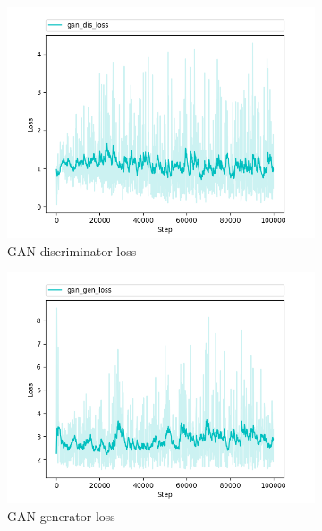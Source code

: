 \begin{figure}[h]
  \begin{subfigure}[b]{0.5\textwidth}
    \includegraphics[width=\textwidth]{figures/gan_dis_loss}
    \caption{GAN discriminator loss}
    \label{fig:gan_dis_loss}
  \end{subfigure}
  \hfill
  \begin{subfigure}[b]{0.5\textwidth}
    \includegraphics[width=\textwidth]{figures/gan_gen_loss}
    \caption{GAN generator loss}
    \label{fig:gan_gen_loss}
  \end{subfigure}
  \begin{subfigure}[b]{0.5\textwidth}

\end{subfigure}
\end{figure}
